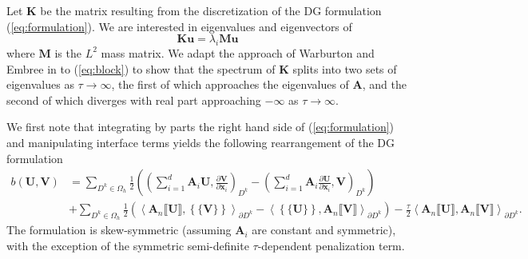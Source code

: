 \documentclass[preprint,10pt]{elsarticle}
\newcommand{\pd}[2]{\frac{\partial#1}{\partial#2}}
\newcommand{\LRp}[1]{\left( #1 \right)}
\newcommand{\LRa}[1]{\left\langle #1 \right\rangle}
\newcommand{\LRc}[1]{\left\{ #1 \right\}}
\newcommand{\jump}[1] {\ensuremath{\llbracket#1\rrbracket}}
\newcommand{\avg}[1] {\ensuremath{\LRc{\!\{#1\}\!}}}
\newcommand{\Oh}{\Omega_h}
\newcommand{\note}[1]{{\color{blue}#1}}
\begin{document}
Let $\bm{K}$ be the matrix resulting from the discretization of the DG formulation (\ref{eq:formulation}).  We are interested in eigenvalues and eigenvectors of 
\[
\bm{K}\bm{u} = \lambda_i\bm{M}\bm{u}
\]
where $\bm{M}$ is the $L^2$ mass matrix.  We adapt the approach of Warburton and Embree in \cite{Warburton20063205} to (\ref{eq:block}) to show that the \note{spectrum} of $\bm{K}$ splits into two sets of eigenvalues as $\tau\rightarrow \infty$, the first of which approaches the eigenvalues of $\bm{A}$, and the second of which diverges with real part approaching $-\infty$ as $\tau\rightarrow \infty$.  

\note{We first note that integrating by parts the right hand side of (\ref{eq:formulation}) and manipulating interface terms yields the following rearrangement of the DG formulation
\begin{align}
b(\bm{U},\bm{V}) &=\sum_{D^k\in \Oh} \frac{1}{2}\LRp{ \LRp{\sum_{i=1}^d\bm{A}_i\bm{U}, \pd{\bm{V}}{\bm{x}_i}}_{D^k} - \LRp{\sum_{i=1}^d\bm{A}_i \pd{\bm{U}}{\bm{x}_i}, {\bm{V}}}_{D^k}} \label{eq:dgformskew}\\
&+ \sum_{D^k\in \Oh}\frac{1}{2}\LRp{\LRa{\bm{A}_n\jump{\bm{U}}, \avg{\bm{V}}}_{\partial D^k}-\LRa{\avg{\bm{U}}, \bm{A}_n\jump{\bm{V}}}_{\partial D^k}} - \frac{\tau}{2}\LRa{\bm{A}_n\jump{\bm{U}},\bm{A}_n\jump{\bm{V}}}_{\partial D^k}.
\nonumber
\end{align}
The formulation is skew-symmetric (assuming $\bm{A}_i$ are constant and symmetric), with the exception of the symmetric semi-definite $\tau$-dependent penalization term.}
\end{document}
